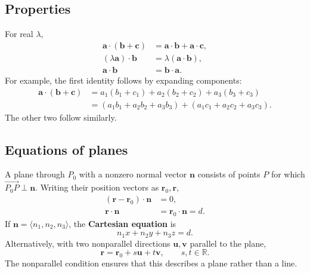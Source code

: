 \subsection{Properties}
For real $\lambda$,
\begin{align*}
 \mathbf a\cdot(\mathbf b+\mathbf c)&=\mathbf a\cdot\mathbf b+\mathbf a\cdot\mathbf c,\\
 (\lambda\mathbf a)\cdot\mathbf b&=\lambda(\mathbf a\cdot\mathbf b),\\
 \mathbf a\cdot\mathbf b&=\mathbf b\cdot\mathbf a.
\end{align*}
For example, the first identity follows by expanding components:
\begin{align*}
 \mathbf a\cdot(\mathbf b+\mathbf c)
 &=a_1(b_1+c_1)+a_2(b_2+c_2)+a_3(b_3+c_3)\\
 &=(a_1b_1+a_2b_2+a_3b_3)+(a_1c_1+a_2c_2+a_3c_3).
\end{align*}
The other two follow similarly.

\subsection{Equations of planes}
A plane through $P_0$ with a nonzero normal vector $\mathbf n$ consists of
points $P$ for which $\overrightarrow{P_0P}\perp\mathbf n$.
Writing their position vectors as $\mathbf r_0,\mathbf r$,
\begin{align*}
 (\mathbf r-\mathbf r_0)\cdot\mathbf n&=0,\\
 \mathbf r\cdot\mathbf n&=\mathbf r_0\cdot\mathbf n=d.
\end{align*}
If $\mathbf n=\langle n_1,n_2,n_3\rangle$, the \textbf{Cartesian equation} is
\[
 \boxed{n_1x+n_2y+n_3z=d}.
\]
Alternatively, with two nonparallel directions $\mathbf u,\mathbf v$
parallel to the plane,
\[
 \boxed{\mathbf r=\mathbf r_0+s\mathbf u+t\mathbf v,\qquad s,t\in\mathbb R.}
\]
The nonparallel condition ensures that this describes a plane rather than a line.

